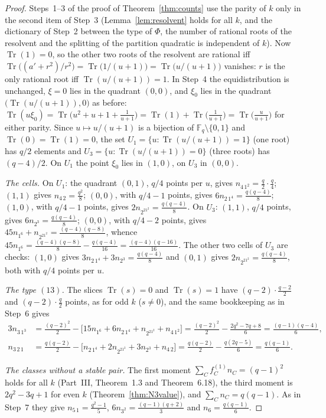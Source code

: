 \documentclass[12pt,a4paper]{amsart}
\theoremstyle{definition}
\newcommand{\F}{\mathbb{F}}
\newcommand{\Tr}{\operatorname{Tr}}
\begin{document}
\begin{proof}
Steps~1--3 of the proof of Theorem~\ref{thm:counts} use the parity of $k$ only in the second item of Step~3 (Lemma~\ref{lem:resolvent} holds for all $k$, and the dictionary of Step~2 between the type of $\Phi$, the number of rational roots of the resolvent and the splitting of the partition quadratic is independent of $k$). Now $\Tr(1)=0$, so the other two roots of the resolvent are rational iff $\Tr\bigl((a'+r^2)/r^2\bigr)=\Tr\bigl(1/(u+1)\bigr)=\Tr\bigl(u/(u+1)\bigr)$ vanishes: $r$ is the only rational root iff $\Tr(u/(u+1))=1$. In Step~4 the equidistribution is unchanged, $\xi=0$ lies in the quadrant $(0,0)$, and $\xi_0$ lies in the quadrant $\bigl(\Tr(u/(u+1)),0\bigr)$ as before: $\Tr(u\xi_0)=\Tr\bigl(u^2+u+1+\tfrac1{u+1}\bigr)=\Tr(1)+\Tr\bigl(\tfrac1{u+1}\bigr)=\Tr\bigl(\tfrac u{u+1}\bigr)$ for either parity. Since $u\mapsto u/(u+1)$ is a bijection of $\F_q\setminus\{0,1\}$ and $\Tr(0)=\Tr(1)=0$, the set $U_1=\{u:\Tr(u/(u+1))=1\}$ (one root) has $q/2$ elements and $U_3=\{u:\Tr(u/(u+1))=0\}$ (three roots) has $(q-4)/2$. On $U_1$ the point $\xi_0$ lies in $(1,0)$, on $U_3$ in $(0,0)$.

\emph{The cells.} On $U_1$: the quadrant $(0,1)$, $q/4$ points per $u$, gives $n_{4\,1^2}=\frac q2\cdot\frac q4$; $(1,1)$ gives $n_{4\,2}=\frac{q^2}8$; $(0,0)$, with $q/4-1$ points, gives $6n_{2\,1^4}=\frac{q(q-4)}8$; $(1,0)$, with $q/4-1$ points, gives $2n_{2^21^2}=\frac{q(q-4)}8$. On $U_3$: $(1,1)$, $q/4$ points, gives $6n_{2^3}=\frac{q(q-4)}8$; $(0,0)$, with $q/4-2$ points, gives $45n_{1^6}+n_{2^21^2}=\frac{(q-4)(q-8)}8$, whence $45n_{1^6}=\frac{(q-4)(q-8)}8-\frac{q(q-4)}{16}=\frac{(q-4)(q-16)}{16}$. The other two cells of $U_3$ are checks: $(1,0)$ gives $3n_{2\,1^4}+3n_{2^3}=\frac{q(q-4)}8$ and $(0,1)$ gives $2n_{2^21^2}=\frac{q(q-4)}8$, both with $q/4$ points per $u$.

\emph{The type $(13)$.} The slices $\Tr(s)=0$ and $\Tr(s)=1$ have $(q-2)\cdot\frac{q-2}2$ and $(q-2)\cdot\frac q2$ points, as for odd $k$ ($s\ne0$), and the same bookkeeping as in Step~6 gives
\begin{align*}
3n_{3\,1^3}&=\tfrac{(q-2)^2}2-\bigl[15n_{1^6}+6n_{2\,1^4}+n_{2^21^2}+n_{4\,1^2}\bigr]=\tfrac{(q-2)^2}2-\tfrac{2q^2-7q+8}6=\tfrac{(q-1)(q-4)}6,\\
n_{3\,2\,1}&=\tfrac{q(q-2)}2-\bigl[n_{2\,1^4}+2n_{2^21^2}+3n_{2^3}+n_{4\,2}\bigr]=\tfrac{q(q-2)}2-\tfrac{q(2q-5)}6=\tfrac{q(q-1)}6 .
\end{align*}

\emph{The classes without a stable pair.} The first moment $\sum_Cf^{(1)}_Cn_C=(q-1)^2$ holds for all $k$ (Part~III, Theorem~1.3 and Theorem~6.18), the third moment is $2q^2-3q+1$ for even $k$ (Theorem~\ref{thm:N3value}), and $\sum_Cn_C=q(q-1)$. As in Step~7 they give $n_{5\,1}=\frac{q^2-1}5$, $6n_{3^2}=\frac{(q-1)(q+2)}3$ and $n_6=\frac{q(q-1)}6$.
\end{proof}
\end{document}
